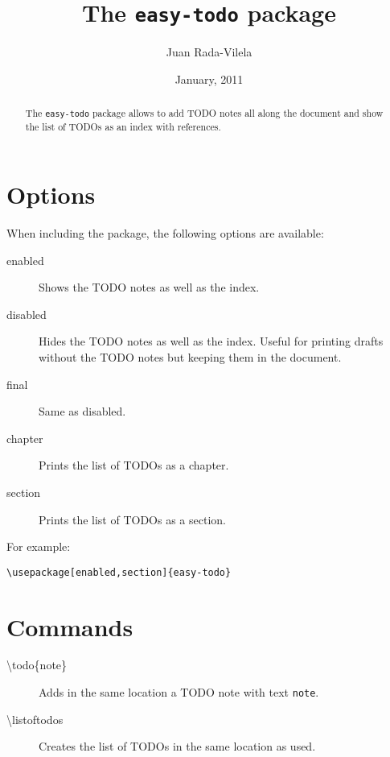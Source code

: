 \documentclass[a4paper]{article}
\begin{document}
	\title{The \texttt{easy-todo} package}
	\author{Juan Rada-Vilela}
	\date{January, 2011}
	
	\maketitle
	
	\begin{abstract}
		The \texttt{easy-todo} package allows to add TODO notes all along the document and show the list of TODOs as an index with references. 
	\end{abstract}
	
	\section{Options}
	When including the package, the following options are available:
	
	\begin{description}
		\item [enabled] Shows the TODO notes as well as the index.
		\item [disabled] Hides the TODO notes as well as the index. Useful for printing drafts without the TODO notes but keeping them in the document.
		\item [final] Same as disabled.
		\item [chapter] Prints the list of TODOs as a chapter.
		\item [section] Prints the list of TODOs as a section.
	\end{description}
	
	For example:
\lstset{language=TeX}
\begin{lstlisting}
\usepackage[enabled,section]{easy-todo}
\end{lstlisting}

	\section{Commands}
	\begin{description}
		\item [\textbackslash todo\{note\}] Adds in the same location a TODO note with text \texttt{note}.
		\item [\textbackslash listoftodos] Creates the list of TODOs in the same location as used.
	\end{description}
	
	
	
	\listoftodos
\end{document}
